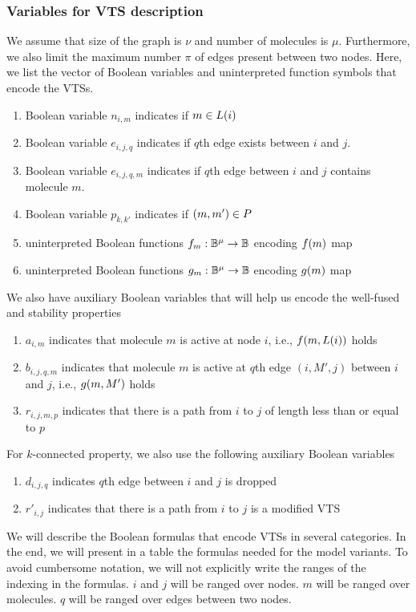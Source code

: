 \subsubsection{Variables for VTS description}
%
We assume that size of the graph is $\nu$ and number of molecules is
$\mu$.
%
Furthermore, we also limit the maximum number $\pi$ of edges present
between two nodes.
%
Here, we list the vector of Boolean variables and uninterpreted function symbols
that encode the VTSs.
\begin{enumerate}

\item Boolean variable $n_{i,m}$ indicates if $m \in L(i)$
\item Boolean variable $e_{i,j,q}$ indicates if $q$th edge exists between $i$ and $j$.
\item Boolean variable $e_{i,j,q,m}$ indicates if $q$th edge between $i$ and $j$ contains molecule $m$.

\item Boolean variable $p_{k,k'}$ indicates if $(m,m') \in P$
\item uninterpreted Boolean functions $f_m : \mathbb{B}^\mu \rightarrow \mathbb{B}$
encoding $f(m)$ map
\item uninterpreted Boolean functions $g_m : \mathbb{B}^\mu \rightarrow \mathbb{B}$
encoding $g(m)$ map
\end{enumerate}
We also have auxiliary Boolean variables that will help us encode the well-fused and stability properties 
\begin{enumerate}
\item $a_{i,m}$ indicates that molecule $m$ is active at node $i$, i.e., $f(m,L(i))$
  holds
\item $b_{i,j,q,m}$ indicates that molecule $m$ is active at $q$th edge $(i,M',j)$ between $i$ and $j$, i.e., $g(m,M')$ holds
\item $r_{i,j,m,p}$ indicates that there is a path from $i$ to $j$ of length less than or equal to $p$
\end{enumerate}
For $k$-connected property, we also use the following auxiliary Boolean variables
\begin{enumerate}
\item $d_{i,j,q}$ indicates $q$th edge between $i$ and $j$ is dropped
\item $r'_{i,j}$ indicates that there is a path from $i$ to $j$ is a modified VTS
\end{enumerate}

We will describe the Boolean formulas that encode VTSs in several categories.
%
In the end, we will present in a table the formulas needed for the
model variants.
%
To avoid cumbersome notation, we will not explicitly write the ranges of the indexing
in the formulas.
%
$i$ and $j$ will be ranged over nodes.
%
$m$ will be ranged over molecules.
%
$q$ will be ranged over edges between two nodes.
%

